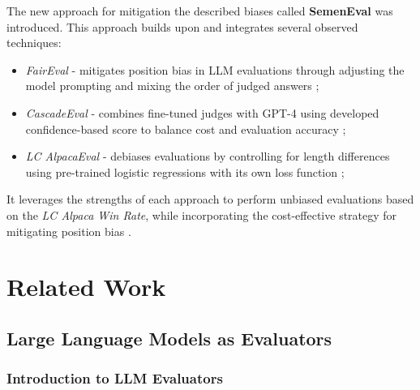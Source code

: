 \documentclass[sigconf, authoryear]{acmart}
\begin{document}
The new approach for mitigation the described biases called \textbf{SemenEval} was introduced.
This approach builds upon and integrates several observed techniques:
\begin{itemize}
    \item \textit{FairEval} - mitigates position bias in LLM evaluations through adjusting the model prompting and mixing the order of judged answers \cite{faireval};
    \item \textit{CascadeEval} - combines fine-tuned judges with GPT-4 using developed confidence-based score to balance cost and evaluation accuracy \cite{cascade_eval};
    \item \textit{LC AlpacaEval} - debiases evaluations by controlling for length differences using pre-trained logistic regressions with its own loss function \cite{lc_alpacha};
\end{itemize}

It leverages the strengths of each approach to perform unbiased evaluations based on the \textit{LC Alpaca Win Rate}, while incorporating the cost-effective strategy for mitigating position bias \cite{alpaca_eval, lc_alpacha}.




\section{Related Work}\label{sec:related-work}

\subsection{Large Language Models as Evaluators}\label{subsec:large-language-models-as-evaluators}

\subsubsection{Introduction to LLM Evaluators}
\end{document}
